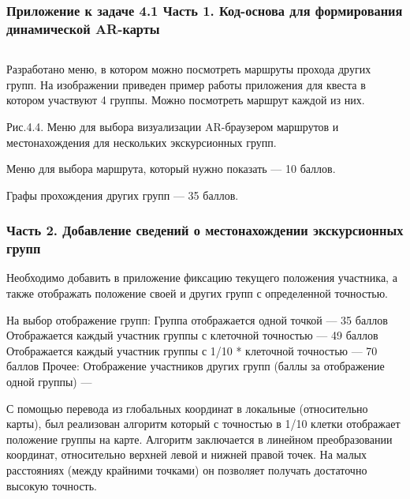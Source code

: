 \subsubsection*{Приложение к задаче 4.1 Часть 1. Код-основа для формирования динамической AR-карты}

\inputminted[fontsize=\footnotesize, linenos]{csharp}{final/command_tour/ar/task_04/source.cs}

Разработано меню, в котором можно посмотреть маршруты прохода других групп. На изображении приведен пример работы приложения для квеста в котором участвуют 4 группы. Можно посмотреть маршрут каждой из них.


\begin{center}
Рис.4.4. Меню для выбора визуализации AR-браузером маршрутов и местонахождения для нескольких экскурсионных групп. 
\end{center}

\markSection

Меню для выбора маршрута, который нужно показать — 10 баллов.

Графы прохождения других групп — 35 баллов.

\subsubsection*{Часть 2.  Добавление сведений о местонахождении экскурсионных групп}

Необходимо добавить в приложение фиксацию текущего положения участника, а также отображать положение своей и других групп с определенной точностью.

\markSection

На выбор отображение групп:
Группа отображается одной точкой — 35 баллов
Отображается каждый участник группы с клеточной точностью — 49 баллов
Отображается каждый участник группы с 1/10 * клеточной точностью — 70 баллов
Прочее:
Отображение участников других групп (баллы за отображение одной группы) — 

\solutionSection

С помощью перевода из глобальных координат в локальные (относительно карты), был реализован алгоритм который с точностью в 1/10 клетки отображает положение группы на карте. Алгоритм заключается в линейном преобразовании координат, относительно верхней левой и нижней правой точек. На малых расстояниях (между крайними точками) он позволяет получать достаточно высокую точность.

